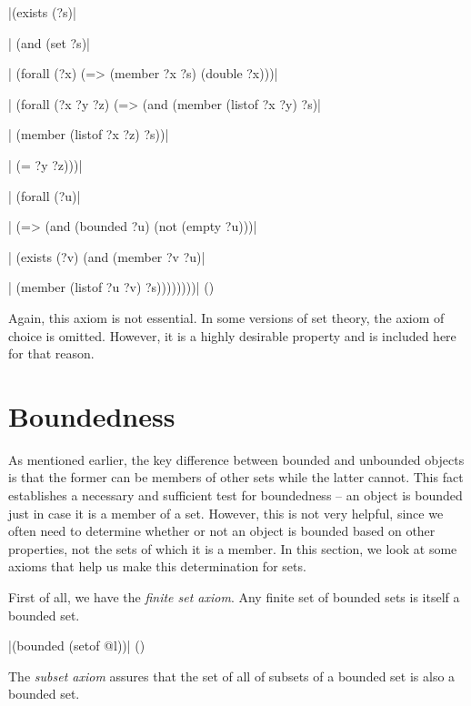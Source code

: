 \medskip
\verbatim|(exists (?s)|\par\nobreak
\verbatim|  (and (set ?s)|\par\nobreak
\verbatim|       (forall (?x) (=> (member ?x ?s) (double ?x)))|\par\nobreak
\verbatim|       (forall (?x ?y ?z) (=> (and (member (listof ?x ?y) ?s)|\par\nobreak
\verbatim|                                   (member (listof ?x ?z) ?s))|\par\nobreak
\verbatim|                              (= ?y ?z)))|\par\nobreak
\verbatim|       (forall (?u)|\par\nobreak
\verbatim|         (=> (and (bounded ?u) (not (empty ?u)))|\par\nobreak
\verbatim|             (exists (?v) (and (member ?v ?u)|\par\nobreak
\verbatim|                               (member (listof ?u ?v) ?s))))))))|
\hfill(\equation)\par
\medskip

Again, this axiom is not essential.  In some versions of set theory, the axiom of
choice is omitted.  However, it is a highly desirable property and is included here
for that reason.

\section{Boundedness}

As mentioned earlier, the key difference between bounded and unbounded objects is
that the former can be members of other sets while the latter cannot.  This fact
establishes a necessary and sufficient test for boundedness -- an object is bounded
just in case it is a member of a set.  However, this is not very helpful, since
we often need to determine whether or not an object is bounded based on other
properties, not the sets of which it is a member.  In this section, we look at some
axioms that help us make this determination for sets.

First of all, we have the {\it finite set axiom}.  Any finite set of bounded sets
is itself a bounded set.

\medskip
\verbatim|(bounded (setof @l))|
\hfill(\equation)\par
\medskip

The {\it subset axiom} assures that the set of all of subsets of a bounded set is
also a bounded set.

